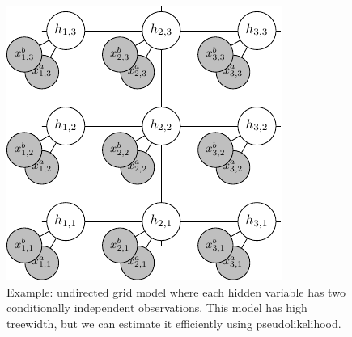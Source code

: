 \begin{figure}
  \centering
  \includegraphics[width=0.6\columnwidth]{figures/mrf.pdf}
  \caption{Example: undirected grid model where each hidden variable has two
  conditionally independent observations.
  This model has high treewidth,
  but we can estimate it efficiently using pseudolikelihood.}
  \label{fig:examples-mrf}
\end{figure}

